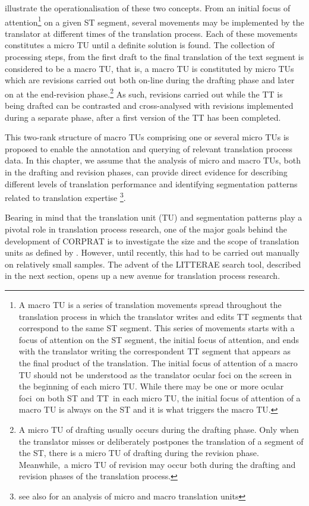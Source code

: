 \documentclass[output=paper]{LSP/langsci}
\begin{document}
\largerpage
\citet{AlvesVale2009} illustrate the operationalisation of these two concepts. From an initial focus of attention\footnote{A macro TU is a series of translation movements spread throughout the translation process in which the translator writes and edits TT segments that correspond to the same ST segment. This series of movements starts with a focus of attention on the ST segment, the initial focus of attention, and ends with the translator writing the correspondent TT segment that appears as the final product of the translation. The initial focus of attention of a macro TU should not be understood as the translator ocular foci on the screen in the beginning of each micro TU. While there may be one or more ocular foci~on both ST and TT~in each micro TU, the initial focus of attention of a macro TU is always on the ST and it is what triggers the macro TU.} on a given ST segment, several movements may be implemented by the translator at different times of the translation process. Each of these movements constitutes a micro TU until a definite solution is found. The collection of processing steps, from the first draft to the final translation of the text segment is considered to be a macro TU, that is, a macro TU is constituted by micro TUs which are revisions carried out both on-line during the drafting phase and later on at the end-revision phase.\footnote{A micro TU of drafting usually occurs during the drafting phase. Only when the translator misses or deliberately postpones the translation of a segment of the ST, there is a micro TU of drafting during the revision phase. Meanwhile,~a micro TU of revision may occur both during the drafting and revision phases of the translation process.} As such, revisions carried out while the TT is being drafted can be contrasted and cross-analysed with revisions implemented during a separate phase, after a first version of the TT has been completed.

This two-rank structure of macro TUs comprising one or several micro TUs is proposed to enable the annotation and querying of relevant translation process data. In this chapter, we assume that the analysis of micro and macro TUs, both in the drafting and revision phases, can provide direct evidence for describing different levels of translation performance and identifying segmentation patterns related to translation expertise \footnote{see also \cite{AlvesEtAl2010} for an analysis of micro and macro translation units}.

Bearing in mind that the translation unit (TU) and segmentation patterns play a pivotal role in translation process research, one of the major goals behind the development of CORPRAT is to investigate the size and the scope of translation units as defined by \citet{Alves2000}. However, until recently, this had to be carried out manually on relatively small samples. The advent of the LITTERAE search tool, described in the next section, opens up a new avenue for translation process research.
\end{document}
